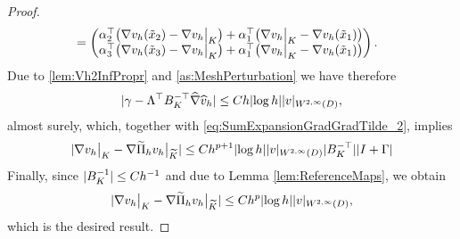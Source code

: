 \documentclass[10pt]{article}
\begin{document}
\begin{proof}
\begin{equation}
\begin{aligned}
	&= \begin{pmatrix} \alpha_2^\top \big(\nabla v_h(\tilde x_2) - \nabla v_h \bigr\rvert_{K}\big) + \alpha_1^\top \big(\nabla v_h \bigr\rvert_{K} - \nabla v_h(\tilde x_1)\big) \\
					   \alpha_3^\top \big(\nabla v_h(\tilde x_3) - \nabla v_h \bigr\rvert_{K}\big) + \alpha_1^\top \big(\nabla v_h \bigr\rvert_{K} - \nabla v_h(\tilde x_1)\big) \end{pmatrix}.                
\end{aligned}
\end{equation}	
Due to \cref{lem:Vh2InfPropr} and \cref{as:MeshPerturbation} we have therefore
\begin{equation}
	\lvert\gamma - \Lambda^\top B_K^{-\top} \widehat \nabla \widehat v_h\rvert \leq Ch \lvert\log h\rvert\lvert v\rvert_{W^{2, \infty}(D)},
\end{equation}
almost surely, which, together with \eqref{eq:SumExpansionGradGradTilde_2}, implies 
\begin{equation}
	\lvert\nabla v_h\bigr\rvert_{K} - \nabla \widetilde \Pi_h v_h \bigr\rvert_{\widetilde K}\rvert \leq Ch^{p+1}\lvert\log h\rvert\lvert v\rvert_{W^{2, \infty}(D)} \lvert B_K^{-\top}\rvert \lvert I + \Gamma\rvert
\end{equation}
Finally, since $\lvert B_K^{-1}\rvert \leq Ch^{-1}$ and due to Lemma \ref{lem:ReferenceMaps}, we obtain
\begin{equation}
	\lvert\nabla v_h\bigr\rvert_{K} - \nabla \widetilde \Pi_h v_h \bigr\rvert_{\widetilde K}\rvert \leq C h^p \lvert\log h\rvert \lvert v\rvert_{W^{2, \infty}(D)},
\end{equation}
which is the desired result.
\end{proof}
\end{document}
